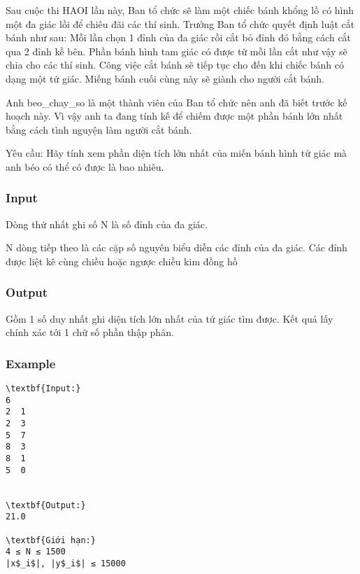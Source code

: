 



   Sau cuộc thi HAOI lần này, Ban tổ chức sẽ làm một chiếc bánh khổng lồ có hình một đa giác lồi để chiêu đãi các thí sinh. Trưởng Ban tổ chức quyết định luật cắt bánh như sau: Mỗi lần chọn 1 đỉnh của đa giác rồi cắt bỏ đỉnh đó bằng cách cắt qua 2 đỉnh kề bên. Phần bánh hình tam giác có được từ mỗi lần cắt như vậy sẽ chia cho các thí sinh. Công việc cắt bánh sẽ tiếp tục cho đến khi chiếc bánh có dạng một tứ giác. Miếng bánh cuối cùng này sẽ giành cho người cắt bánh.  

   Anh beo\_chay\_so là một thành viên của Ban tổ chức nên anh đã biết trước kế hoạch này. Vì vậy anh ta đang tính kế để chiếm được một phần bánh lớn nhất bằng cách tình nguyện làm người cắt bánh.  

   Yêu cầu: Hãy tính xem phần diện tích lớn nhất của miến bánh hình tứ giác mà anh béo có thể có được là bao nhiêu.  

\subsubsection{   Input  }

   Dòng thứ nhất ghi số N là số đỉnh của đa giác.  

   N dòng tiếp theo là các cặp số nguyên biểu diễn các đỉnh của đa giác. Các đỉnh được liệt kê cùng chiều hoặc ngược chiều kim đồng hồ  

\subsubsection{   Output  }

   Gồm 1 số duy nhất ghi diện tích lớn nhất của tứ giác tìm được. Kết quả lấy chính xác tới 1 chữ số phần thập phân.  

\subsubsection{   Example  }
\begin{verbatim}
\textbf{Input:}
6
2  1
2  3
5  7
8  3
8  1
5  0


\textbf{Output:}
21.0

\textbf{Giới hạn:}
4 ≤ N ≤ 1500 
|x$_i$|, |y$_i$| ≤ 15000 
\end{verbatim}